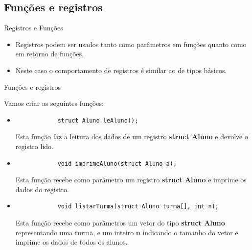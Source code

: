 \documentclass[handout]{beamer}
\begin{document}
\subsection{Funções e registros}

\begin{frame}[fragile]{Registros e Funções}
    \begin{itemize}
        \item Registros podem ser usados tanto como parâmetros em
        funções quanto como em retorno de funções.
        \item Neste caso o comportamento de registros é similar ao de
        tipos básicos.
    \end{itemize}
\end{frame}

\begin{frame}[fragile]{Funções e registros}

    Vamos criar as seguintes funções:
    \begin{itemize}
        \item
        \begin{verbatim}
            struct Aluno leAluno();
        \end{verbatim}
        Esta função faz a leitura dos dados de um registro
        \textbf{struct Aluno} e devolve o registro lido.

        \vspace{-0.5em}
        \item
        \begin{verbatim}
            void imprimeAluno(struct Aluno a);
        \end{verbatim}
        Esta função recebe como parâmetro um registro
        \textbf{struct Aluno} e imprime os dados do registro.

        \vspace{-0.5em}
        \item
        \begin{verbatim}
            void listarTurma(struct Aluno turma[], int n);
        \end{verbatim}
        Esta função recebe como parâmetros um vetor do tipo
        \textbf{struct Aluno} representando uma turma, e um inteiro
        \textbf{n} indicando o tamanho do vetor e imprime
        os dados de todos os alunos.
    \end{itemize}

\end{frame}
\end{document}
